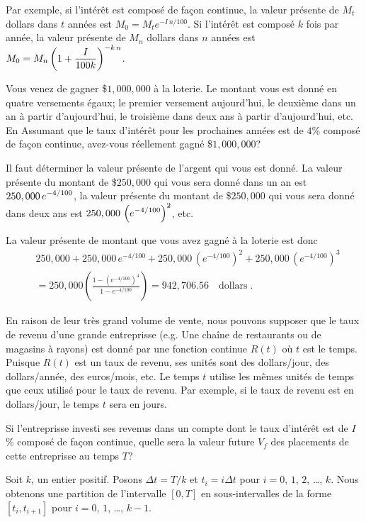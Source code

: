 {Par exemple, si l'intérêt est composé de façon continue, la valeur
présente de $M_t$ dollars dans $t$ années est
$M_0 = M_t e^{-I\,n/100}$.  Si l'intérêt est composé $k$ fois par
année, la valeur présente de $M_n$ dollars dans $n$ 
années est
$\displaystyle M_0 = M_n \left(1 + \frac{I}{100k}\right)^{-k\,n}$.

\begin{egg}
Vous venez de gagner \$$1,000,000$ à la loterie.  Le montant vous est donné
en quatre versements égaux; le premier versement aujourd'hui, le deuxième
dans un an à partir d'aujourd'hui, le troisième dans deux ans à partir
d'aujourd'hui, etc.  En Assumant que le taux d'intérêt pour les
prochaines années est de $4$\% composé de façon continue,
avez-vous réellement gagné \$$1,000,000$?  

Il faut déterminer la valeur présente de l'argent qui vous est donné.  La
valeur présente du montant de \$$250,000$ qui vous sera donné dans un an est
$\displaystyle 250,000\,e^{-4/100}$, la valeur présente du montant de
\$$250,000$ qui vous sera donné dans deux ans est
$\displaystyle 250,000\,\left(e^{-4/100}\right)^2$, etc.

La valeur présente de montant que vous avez gagné à la loterie est donc
\begin{align*}
& 250,000 + 250,000\,e^{-4/100} + 250,000\,\left(e^{-4/100}\right)^2
+ 250,000\,\left(e^{-4/100}\right)^3 \\
&= 250, 000 \left( \frac{1- \left(e^{-4/100}\right)^4}{1-e^{-4/100}} \right)
= 942,706.56 \quad \text{dollars}\; .
\end{align*}
\end{egg}

En raison de leur très grand volume de vente, nous pouvons supposer que le
taux de revenu d'une grande entreprisse (e.g. Une chaîne de restaurants
ou de magasins à rayons) est donné par une fonction continue $R(t)$ où
$t$ est le temps.  Puisque $R(t)$ est un taux de revenu, ses unités
sont des dollars/jour, des dollars/année, des euros/mois, etc.  Le
temps $t$ utilise les mêmes unités de temps que ceux utilisé pour le
taux de revenu.  Par exemple, si le taux de revenu est en
dollars/jour, le temps $t$ sera en jours.

Si l'entreprisse investi ses revenus dans un compte dont le taux
d'intérêt est de $I$\% composé de façon continue, quelle sera la valeur
future $V_f$ des placements de cette entreprisse au temps $T$?

Soit $k$, un entier positif.  Posons
$\Delta t = T/k$ et $t_i = i \Delta t$
pour $i=0$, $1$, $2$, \ldots, $k$.  Nous obtenons une partition de l'intervalle
$[0,T]$ en sous-intervalles de la forme $[t_i,t_{i+1}]$ pour $i=0$, $1$,
\ldots, $k-1$.

}
